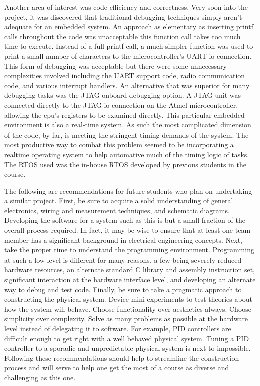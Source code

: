 Another area of interest was code efficiency and correctness.  Very soon into the project, it was discovered that traditional debugging techniques simply aren't adequate for an embedded system.  An approach as elementary as inserting printf calls throughout the code was unacceptable this function call takes too much time to execute.  Instead of a full printf call, a much simpler function was used to print a small number of characters to the microcontroller's UART io connection.  This form of debugging was acceptable but there were some unnecessary complexities involved including the UART support code, radio communication code, and various interrupt handlers.  An alternative that was superior for many debugging tasks was the JTAG onboard debugging option.  A JTAG unit was connected directly to the JTAG io connection on the Atmel microcontroller, allowing the cpu's registers to be examined directly.  This particular embedded environment is also a real-time system.  As such the most complicated dimension of the code, by far, is meeting the stringent timing demands of the system.  The most productive way to combat this problem seemed to be incorporating a realtime operating system to help automative much of the timing logic of tasks.  The RTOS used was the in-house RTOS developed by previous students in the course.  

The following are recommendations for future students who plan on undertaking a similar project.  First, be sure to acquire a solid understanding of general electronics, wiring and measurement techniques, and schematic diagrams.  Developing the software for a system such as this is but a small fraction of the overall process required.  In fact, it may be wise to ensure that at least one team member has a significant background in electrical engineering concepts. Next, take the proper time to understand the programming environment.  Programming at such a low level is different for many reasons, a few being severely reduced hardware resources, an alternate standard C library and assembly instruction set, significant interaction at the hardware interface level, and developing an alternate way to debug and test code.  Finally, be sure to take a pragmatic approach to constructing the physical system.  Device mini experiments to test theories about how the system will behave.  Choose functionality over aesthetics always. Choose simplicity over complexity.  Solve as many problems as possible at the hardware level instead of delegating it to software.  For example, PID controllers are difficult enough to get right with a well behaved physical system.  Tuning a PID controller to a sporadic and unpredictable physical system is next to impossible.  Following these recommendations should help to streamline the construction process and will serve to help one get the most of a course as diverse and challenging as this one. 